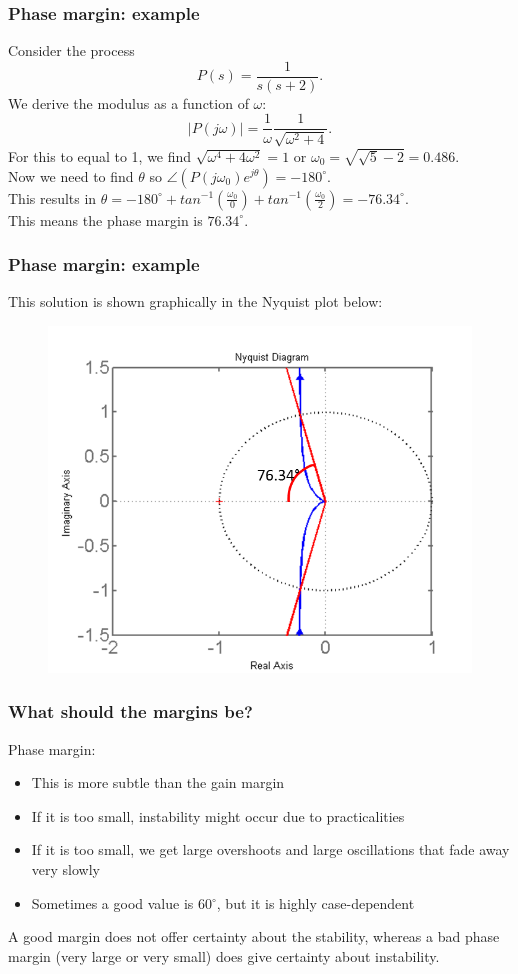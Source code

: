 \begin{frame}
	\frametitle{Phase margin: example}
	Consider the process \vspace{-2ex} $$P(s)=\frac{1}{s(s+2)}.$$
	We derive the modulus as a function of $\omega$: $$\big|P(j\omega)\big|=\frac{1}{\omega}\frac{1}{\sqrt{\omega^2+4}}.$$
	For this to equal to 1, we find $\sqrt{\omega^4+4\omega^2}=1$ or $\omega_0=\sqrt{\sqrt{5}-2}=0.486$.\\
	Now we need to find $\theta$ so $\angle(P(j\omega_0)e^{j\theta})=-180^{\circ}$.\\
	This results in $\theta = -180^{\circ}+tan^{-1}(\frac{\omega_0}{0})+tan^{-1}(\frac{\omega_0}{2})=-76.34^{\circ}$. \\
	This means the phase margin is $76.34^{\circ}$.
\end{frame}

\begin{frame}
	\frametitle{Phase margin: example}
	This solution is shown graphically in the Nyquist plot below:
	\begin{figure}
		\includegraphics[width=0.65\linewidth]{phase_example}
	\end{figure}
\end{frame}

\begin{frame}
	\frametitle{What should the margins be?}
	\vspace{-4ex}
	Phase margin:
	\begin{itemize}
		\item This is more subtle than the gain margin
		\item If it is too small, instability might occur due to practicalities
		\item If it is too small, we get large overshoots and large oscillations that fade away very slowly
		\item Sometimes a good value is 60$^{\circ}$, but it is highly case-dependent
	\end{itemize}
	\bigskip
	A good margin does not offer certainty about the stability, whereas a bad phase margin (very large or very small) does give certainty about instability.
\end{frame}

